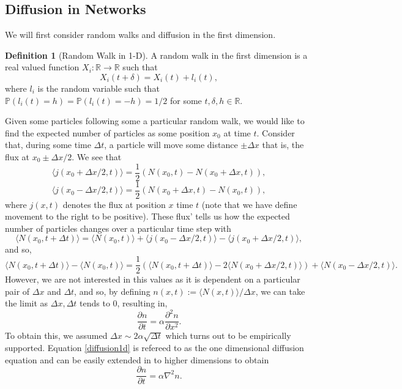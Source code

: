 \documentclass[
]{article}
\theoremstyle{definition}
\newtheorem{definition}{Definition}[section]
\begin{document}
\hypertarget{diffusion-in-networks}{%
\subsection{Diffusion in Networks}\label{diffusion-in-networks}}

We will first consider random walks and diffusion in the first
dimension.

\begin{definition}[Random Walk in 1-D]
  A random walk in the first dimension is a real valued function 
  \(X_i : \mathbb{R} \to \mathbb{R}\) such that 
  \[X_i(t + \delta) = X_i(t) + l_i(t),\]
  where \(l_i\) is the random variable such that 
  \(\mathbb{P}(l_i(t) = h) = \mathbb{P}(l_i(t) = -h) = 1 / 2\) for 
  some \(t, \delta, h \in \mathbb{R}\).
\end{definition}

Given some particles following some a particular random walk, we would
like to find the expected number of particles as some position \(x_0\)
at time \(t\). Consider that, during some time \(\Delta t\), a particle
will move some distance \(\pm \Delta x\) that is, the flux at
\(x_0 \pm \Delta x/ 2\). We see that
\[\langle j(x_0 + \Delta x / 2, t) \rangle = \frac{1}{2}(N(x_0, t) - N(x_0 + \Delta x, t)),\]
\[\langle j(x_0 - \Delta x / 2, t) \rangle = \frac{1}{2}(N(x_0 + \Delta x, t) - N(x_0, t)),\]
where \(j(x, t)\) denotes the flux at position \(x\) time \(t\) (note
that we have define movement to the right to be positive). These flux'
tells us how the expected number of particles changes over a particular
time step with
\[\langle N(x_0, t + \Delta t) \rangle = \langle N(x_0, t) \rangle + 
  \langle j(x_0 - \Delta x / 2, t) \rangle -
  \langle j(x_0 + \Delta x / 2, t) \rangle,\] and so,
\[\langle N(x_0, t + \Delta t) \rangle - \langle N(x_0, t) \rangle = 
  \frac{1}{2}(\langle N(x_0, t + \Delta t) \rangle - 
   2\langle N(x_0 + \Delta x / 2, t) \rangle) +
  \langle N(x_0 - \Delta x / 2, t) \rangle.\] However, we are not
interested in this values as it is dependent on a particular pair of
\(\Delta x\) and \(\Delta t\), and so, by defining
\(n(x, t) := \langle N(x, t) \rangle / \Delta x\), we can take the limit
as \(\Delta x, \Delta t\) tends to 0, resulting in,
\begin{equation}\label{diffusion1d}
\frac{\partial{n}}{\partial{t}} = \alpha \frac{\partial^2{n}}{\partial{x}^2}.  
\end{equation} To obtain this, we assumed
\(\Delta x \sim 2\alpha \sqrt{\Delta t}\) which turns out to be
empirically supported. Equation \ref{diffusion1d} is refereed to as the
one dimensional diffusion equation and can be easily extended in to
higher dimensions to obtain \begin{equation}
  \frac{\partial{n}}{\partial{t}} = \alpha \nabla ^2 n.
\end{equation}
\end{document}
